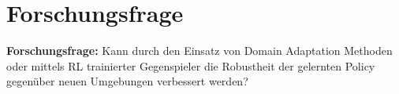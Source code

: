 \section{Forschungsfrage}

\textbf{Forschungsfrage:}
Kann durch den Einsatz von Domain Adaptation Methoden oder mittels RL trainierter Gegenspieler die Robustheit der gelernten Policy gegenüber neuen Umgebungen verbessert werden?
